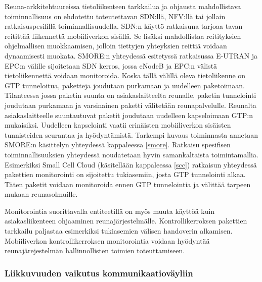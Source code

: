 Reuna-arkkitehtuureissa tietoliikenteen tarkkailua ja ohjausta mahdollistava toiminnallisuus on ehdotettu toteutettavan SDN:llä, NFV:llä tai jollain ratkaisuspesifillä toiminnallisuudella. 
SDN:n käyttö ratkaisuna tarjoaa tavan reitittää liikennettä mobiiliverkon sisällä. Se lisäksi mahdollistaa reitityksien ohjelmallisen muokkaamisen, jolloin tiettyjen yhteyksien reittiä voidaan dynaamisesti muokata. SMORE:n yhteydessä esitetyssä ratkaisussa  E-UTRAN ja EPC:n välille sijoitetaan SDN kerros, jossa eNodeB ja EPC:n välistä tietoliikennettä voidaan monitoroida. 
Koska tällä välillä oleva tietoliikenne on GTP tunneloitua, paketteja joudutaan purkamaan ja uudelleen paketoimaan. 
Tilanteessa jossa paketin suunta on asiakaslaitteelta reunalle, paketin tunnelointi joudutaan purkamaan ja varsinainen paketti välitetään reunapalvelulle. 
Reunalta asiakaslaitteelle suuntautuvat paketit joudutaan uudelleen kapseloimaan GTP:n mukaisiksi.
Uudelleen kapselointi vaatii erinäisten mobiiliverkon sisäisten tunnisteiden seurantaa ja hyödyntämistä.
Tarkempi kuvaus toiminnasta annetaan SMORE:n käsittelyn yhteydessä kappaleessa \ref{smore}.
Ratkaisu spesifisen toiminnallisuuksien yhteydessä noudatetaan hyvin samankaltaista toimintamallia. Esimerkiksi Small Cell Cloud (käsitellään kappaleessa \ref{scc}) ratkaisun yhteydessä pakettien monitorointi on sijoitettu tukiasemiin, josta GTP tunnelointi alkaa.
Täten paketit voidaan monitoroida ennen GTP tunnelointia ja välittää tarpeen mukaan reunasolmuille.

Monitorointia suorittavalla entiteetillä on myös muuta käyttöä kuin asiakasliikenteen ohjaaminen reunajärjestelmälle.
Kontrollikerroksen pakettien tarkkailu paljastaa esimerkiksi tukiasemien välisen handoverin alkamisen.
Mobiiliverkon kontrollikerroksen monitorointia voidaan hyödyntää reunajärejestelmän hallinnollisten toimien toteuttamiseen.

\subsubsection*{Liikkuvuuden vaikutus kommunikaatioväyliin}

